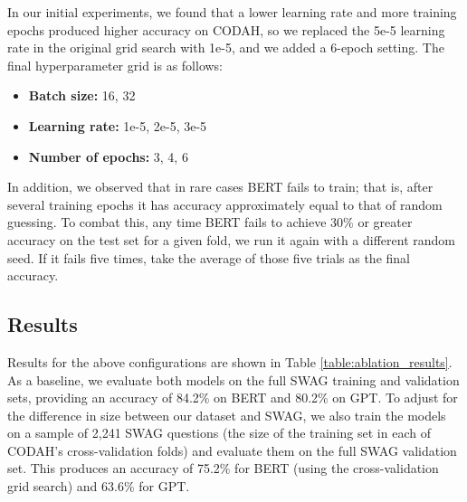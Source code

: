 \documentclass[11pt,a4paper]{article}
\begin{document}
    In our initial experiments, we found that a lower learning rate and more training epochs produced higher accuracy on CODAH, so we replaced the 5e-5 learning rate in the original grid search with 1e-5, and we added a 6-epoch setting. The final hyperparameter grid is as follows:
    \begin{itemize}
        \item \textbf{Batch size:} 16, 32
        \vspace{-0.75em}
        \item \textbf{Learning rate:} 1e-5, 2e-5, 3e-5
        \vspace{-0.75em}
        \item \textbf{Number of epochs:} 3, 4, 6
    \end{itemize}

    In addition, we observed that in rare cases BERT fails to train; that is, after several training epochs it has accuracy approximately equal to that of random guessing. To combat this, any time BERT fails to achieve 30\% or greater accuracy on the test set for a given fold, we run it again with a different random seed. If it fails five times, take the average of those five trials as the final accuracy.

    \subsection{Results}
    Results for the above configurations are shown in Table \ref{table:ablation_results}. As a baseline, we evaluate both models on the full SWAG training and validation sets, providing an accuracy of 84.2\% on BERT and 80.2\% on GPT. To adjust for the difference in size between our dataset and SWAG, we also train the models on a sample of 2,241 SWAG questions (the size of the training set in each of CODAH's cross-validation folds) and evaluate them on the full SWAG validation set. This produces an accuracy of 75.2\% for BERT (using the cross-validation grid search) and 63.6\% for GPT.
    
\end{document}
